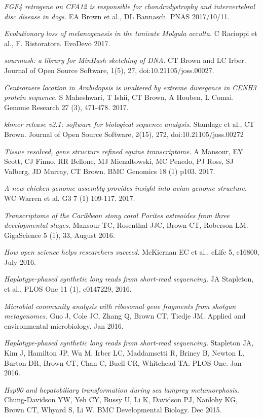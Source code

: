 \documentclass[margin,line]{resume}
\begin{document}
\begin{resume}
{\em FGF4 retrogene on CFA12 is responsible for chondrodystrophy and intervertebral disc disease in dogs.} EA Brown et al., DL Bannasch. PNAS 2017/10/11.

{\em Evolutionary loss of melanogenesis in the tunicate Molgula occulta.} C Racioppi et al., F. Ristoratore. EvoDevo 2017.

{\em sourmash: a library for MinHash sketching of DNA}. CT Brown and LC Irber. Journal of Open Source Software, 1(5), 27, doi:10.21105/joss.00027.

{\em Centromere location in Arabidopsis is unaltered by extreme divergence in CENH3 protein sequence.} S Maheshwari, T Ishii, CT Brown, A Houben, L Comai. Genome Research 27 (3), 471-478. 2017.

{\em khmer release v2.1: software for biological sequence analysis.} Standage et al., CT Brown. Journal of Open Source Software, 2(15), 272, doi:10.21105/joss.00272

{\em Tissue resolved, gene structure refined equine transcriptome.} A Mansour, EY Scott, CJ Finno, RR Bellone, MJ Mienaltowski, MC Penedo, PJ Ross, SJ Valberg, JD Murray, CT Brown. BMC Genomics 18 (1) p103. 2017.

{\em A new chicken genome assembly provides insight into avian genome structure}. WC Warren et al. G3 7 (1) 109-117. 2017.

{\em Transcriptome of the Caribbean stony coral Porites astreoides from three developmental stages.} Mansour TC, Rosenthal JJC, Brown CT, Roberson LM.
GigaScience 5 (1), 33, August 2016.

{\em How open science helps researchers succeed.}
McKiernan EC et al., eLife 5, e16800, July 2016.

{\em Haplotype-phased synthetic long reads from short-read sequencing.}
JA Stapleton, et al.,
PLOS One 11 (1), e0147229, 2016.

{\em Microbial community analysis with ribosomal gene fragments from shotgun metagenomes.} Guo J, Cole JC, Zhang Q, Brown CT, Tiedje JM. Applied and environmental microbiology. Jan 2016.

{\em Haplotype-phased synthetic long reads from short-read sequencing.} Stapleton JA, Kim J, Hamilton JP, Wu M, Irber LC, Maddamsetti R, Briney B, Newton L, Burton DR, Brown CT, Chan C, Buell CR, Whitehead TA. PLOS One. Jan 2016.

{\em Hsp90 and hepatobiliary transformation during sea lamprey metamorphosis.}
Chung-Davidson YW, Yeh CY, Bussy U, Li K, Davidson PJ, Nanlohy KG, Brown CT, Whyard S, Li W. BMC Developmental Biology. Dec 2015.


\end{resume}
\end{document}
